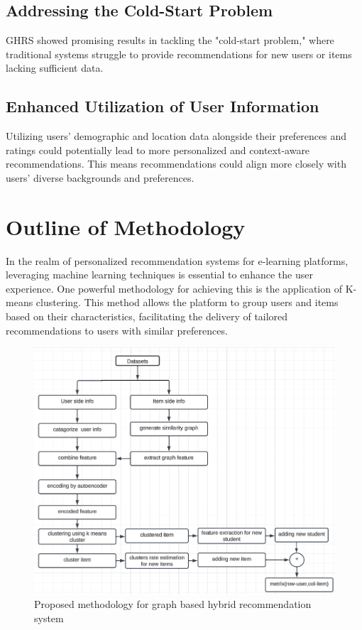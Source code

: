 \subsection{Addressing the Cold-Start Problem}
GHRS showed promising results in tackling the "cold-start problem," where traditional systems struggle to provide recommendations for new users or items lacking sufficient data. 
\subsection{Enhanced Utilization of User Information}
Utilizing users' demographic and location data alongside their preferences and ratings could potentially lead to more personalized and context-aware recommendations. This means recommendations could align more closely with users' diverse backgrounds and preferences.

\section{Outline of Methodology}
In the realm of personalized recommendation systems for e-learning platforms, leveraging machine learning techniques is essential to enhance the user experience. One powerful methodology for achieving this is the application of K-means clustering. This method allows the platform to group users and items based on their characteristics, facilitating the delivery of tailored recommendations to users with similar preferences.

\begin{figure}[h]
    \centering
    \includegraphics[width=1\linewidth]{figures/proposal methodology.png}
    \caption{Proposed methodology for graph based hybrid recommendation system}
    \label{fig:enter-label}
\end{figure}
